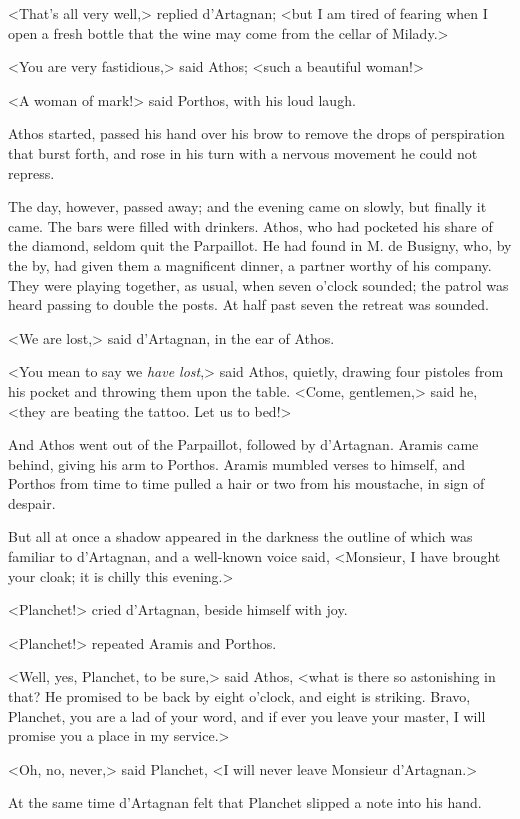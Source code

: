 <That's all very well,> replied d'Artagnan; <but I am tired of fearing when I open a fresh bottle that the wine may come from the cellar of Milady.> 

<You are very fastidious,> said Athos; <such a beautiful woman!> 

<A woman of mark!> said Porthos, with his loud laugh. 

Athos started, passed his hand over his brow to remove the drops of perspiration that burst forth, and rose in his turn with a nervous movement he could not repress. 

The day, however, passed away; and the evening came on slowly, but finally it came. The bars were filled with drinkers. Athos, who had pocketed his share of the diamond, seldom quit the Parpaillot. He had found in M. de Busigny, who, by the by, had given them a magnificent dinner, a partner worthy of his company. They were playing together, as usual, when seven o'clock sounded; the patrol was heard passing to double the posts. At half past seven the retreat was sounded. 

<We are lost,> said d'Artagnan, in the ear of Athos. 

<You mean to say we \textit{have lost},> said Athos, quietly, drawing four pistoles from his pocket and throwing them upon the table. <Come, gentlemen,> said he, <they are beating the tattoo. Let us to bed!> 

And Athos went out of the Parpaillot, followed by d'Artagnan. Aramis came behind, giving his arm to Porthos. Aramis mumbled verses to himself, and Porthos from time to time pulled a hair or two from his moustache, in sign of despair. 

But all at once a shadow appeared in the darkness the outline of which was familiar to d'Artagnan, and a well-known voice said, <Monsieur, I have brought your cloak; it is chilly this evening.> 

<Planchet!> cried d'Artagnan, beside himself with joy. 

<Planchet!> repeated Aramis and Porthos. 

<Well, yes, Planchet, to be sure,> said Athos, <what is there so astonishing in that? He promised to be back by eight o'clock, and eight is striking. Bravo, Planchet, you are a lad of your word, and if ever you leave your master, I will promise you a place in my service.> 

<Oh, no, never,> said Planchet, <I will never leave Monsieur d'Artagnan.> 

At the same time d'Artagnan felt that Planchet slipped a note into his hand. 


